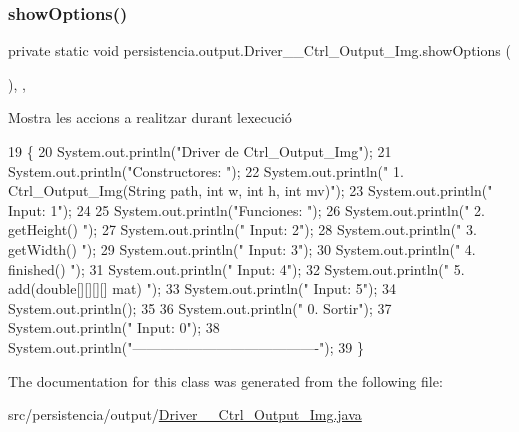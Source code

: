 \subsubsection{\texorpdfstring{show\+Options()}{showOptions()}}
{\footnotesize\ttfamily private static void persistencia.\+output.\+Driver\+\_\+\+\_\+\+Ctrl\+\_\+\+Output\+\_\+\+Img.\+show\+Options (\begin{DoxyParamCaption}{ }\end{DoxyParamCaption})\hspace{0.3cm}{\ttfamily [inline]}, {\ttfamily [static]}, {\ttfamily [private]}}



Mostra les accions a realitzar durant l\textquotesingle{}execució 


\begin{DoxyCode}
19                                      \{
20         System.out.println(\textcolor{stringliteral}{"Driver de Ctrl\_Output\_Img"});
21         System.out.println(\textcolor{stringliteral}{"Constructores: "});
22         System.out.println(\textcolor{stringliteral}{"     1. Ctrl\_Output\_Img(String path, int w, int h, int mv)"});
23         System.out.println(\textcolor{stringliteral}{"     Input: 1"});
24 
25         System.out.println(\textcolor{stringliteral}{"Funciones: "});
26         System.out.println(\textcolor{stringliteral}{"     2. getHeight() "});
27         System.out.println(\textcolor{stringliteral}{"     Input: 2"});
28         System.out.println(\textcolor{stringliteral}{"     3. getWidth() "});
29         System.out.println(\textcolor{stringliteral}{"     Input: 3"});
30         System.out.println(\textcolor{stringliteral}{"     4. finished() "});
31         System.out.println(\textcolor{stringliteral}{"     Input: 4"});
32         System.out.println(\textcolor{stringliteral}{"     5. add(double[][][][] mat) "});
33         System.out.println(\textcolor{stringliteral}{"     Input: 5"});
34         System.out.println();
35 
36         System.out.println(\textcolor{stringliteral}{"     0. Sortir"});
37         System.out.println(\textcolor{stringliteral}{"     Input: 0"});
38         System.out.println(\textcolor{stringliteral}{"----------------------------------------"});
39     \}
\end{DoxyCode}


The documentation for this class was generated from the following file\+:\begin{DoxyCompactItemize}
\item 
src/persistencia/output/\hyperlink{Driver____Ctrl__Output__Img_8java}{Driver\+\_\+\+\_\+\+Ctrl\+\_\+\+Output\+\_\+\+Img.\+java}\end{DoxyCompactItemize}
